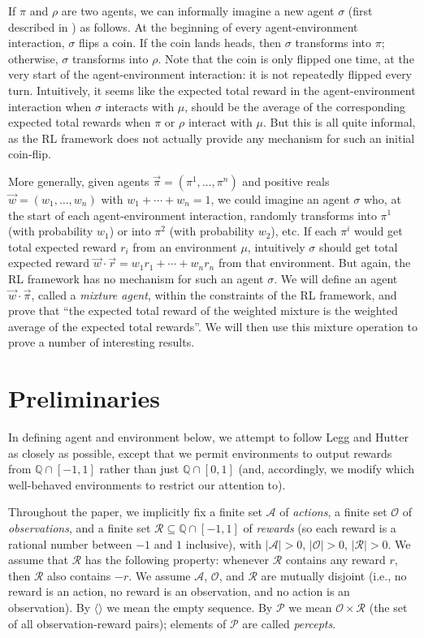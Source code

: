 \documentclass[runningheads]{llncs}
\begin{document}
If $\pi$ and $\rho$ are two agents, we can informally imagine a new agent
$\sigma$ (first described in \cite{alexander2021reward})
as follows. At the beginning of every agent-environment interaction,
$\sigma$ flips a coin. If the coin lands heads, then $\sigma$ transforms into
$\pi$; otherwise, $\sigma$ transforms into $\rho$. Note that the coin is only
flipped one time, at the very start of the agent-environment interaction:
it is not repeatedly flipped every turn. Intuitively, it seems like the
expected total reward in the agent-environment interaction
when $\sigma$ interacts with $\mu$, should be the average
of the corresponding expected total rewards when $\pi$ or $\rho$ interact
with $\mu$. But this is all quite informal, as the RL
framework does not actually provide any mechanism for such an initial
coin-flip.

More generally, given agents $\vec{\pi}=(\pi^1,\ldots,\pi^n)$ and positive reals
$\vec{w}=(w_1,\ldots,w_n)$ with $w_1+\cdots+w_n=1$, we could imagine an agent $\sigma$
who, at the start of each agent-environment interaction, randomly transforms
into $\pi^1$ (with probability $w_1$) or into $\pi^2$ (with probability $w_2$),
etc. If each $\pi^i$ would get total expected reward $r_i$ from an environment
$\mu$, intuitively $\sigma$ should get total expected reward
$\vec{w}\cdot \vec{r}=w_1r_1+\cdots+w_nr_n$ from that environment.
But again, the RL
framework has no mechanism for such an agent $\sigma$. We will define
an agent $\vec{w}\cdot\vec{\pi}$, called a \emph{mixture agent},
within the constraints
of the RL framework, and prove that ``the expected total reward of the
weighted mixture is the weighted average of the expected total rewards''.
We will then use this mixture operation to prove a number of interesting results.

\section{Preliminaries}

In defining agent and environment below, we attempt to follow
Legg and Hutter \cite{legg2007universal} as closely as possible,
except that we permit environments to output rewards from $\mathbb Q \cap [-1,1]$
rather than just $\mathbb Q\cap [0,1]$ (and, accordingly, we modify which well-behaved
environments to restrict our attention to).

Throughout the paper, we implicitly
fix a finite set $\mathcal A$ of \emph{actions},
a finite set $\mathcal O$ of \emph{observations},
and a finite set $\mathcal R\subseteq \mathbb Q\cap [-1,1]$ of \emph{rewards}
(so each reward is a rational number between $-1$ and $1$ inclusive),
with $|\mathcal A|>0$,
$|\mathcal O|>0$, $|\mathcal R|>0$.
We assume that $\mathcal R$ has the following property:
whenever $\mathcal R$ contains any reward $r$, then $\mathcal R$
also contains $-r$.
We assume $\mathcal A$, $\mathcal O$, and $\mathcal R$ are mutually disjoint
(i.e., no reward is an action, no reward is an observation, and no action is an
observation).
By $\langle\rangle$ we mean the empty sequence.
By $\mathcal P$ we mean $\mathcal O\times\mathcal R$ (the set of all observation-reward
pairs); elements of $\mathcal P$ are called \emph{percepts}.
\end{document}

